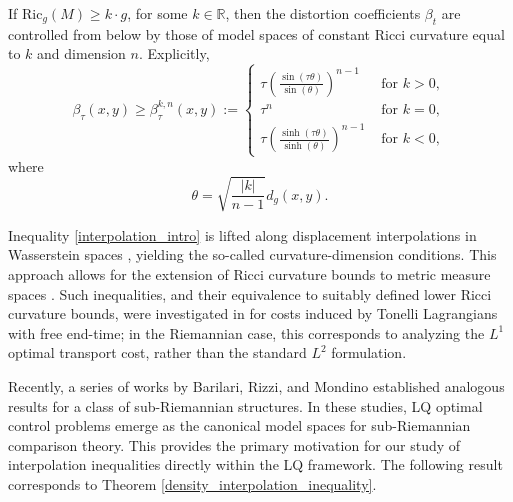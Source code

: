 \documentclass[reqno]{amsart}
\theoremstyle{plain}
\theoremstyle{definition}
\theoremstyle{remark}
\begin{document}
	If $\mathrm{Ric}_g(M)\geq k\cdot g$, for some $k\in\mathbb{R}$, then the distortion coefficients $\beta_t$ are controlled from below by those of model spaces of constant Ricci curvature equal to $k$ and dimension $n$. Explicitly,
		\begin{equation}\label{reference_coefficients}
		\beta_{\tau}(x,y)\geq \beta^{k,n}_{\tau}(x,y):=\begin{cases}
			\tau\left(\frac{\sin(\tau\theta)}{\sin(\theta)}\right)^{n-1}&\text{ for }k>0,\\
			\tau^n&\text{ for }k=0,\\
			\tau\left(\frac{\sinh(\tau\theta)}{\sinh(\theta)}\right)^{n-1}&\text{ for }k<0,
		\end{cases}
	\end{equation}
	where
	\begin{equation}
		\theta=\sqrt{\frac{|k|}{n-1}}d_g(x,y).
	\end{equation}

    Inequality \eqref{interpolation_intro} is lifted along displacement interpolations in Wasserstein spaces \cite{ARiemintineq}, yielding the so-called curvature-dimension conditions. This approach allows for the extension of Ricci curvature bounds to metric measure spaces \cite{SturmGeomMmsI,SturmGeomMmsII,lott2006riccicurvmmspaces}. Such inequalities, and their equivalence to suitably defined lower Ricci curvature bounds, were investigated in \cite{rotem} for costs induced by Tonelli Lagrangians with free end-time; in the Riemannian case, this corresponds to analyzing the $L^1$ optimal transport cost, rather than the standard $L^2$ formulation.

Recently, a series of works by Barilari, Rizzi, and Mondino \cite{Barilari_2016,BakriEmeryandmodelspaces,UnifiedsyntheticRicci} established analogous results for a class of sub-Riemannian structures. In these studies, LQ optimal control problems emerge as the canonical model spaces for sub-Riemannian comparison theory. This provides the primary motivation for our study of interpolation inequalities directly within the LQ framework. The following result corresponds to Theorem \ref{density_interpolation_inequality}.
\end{document}
